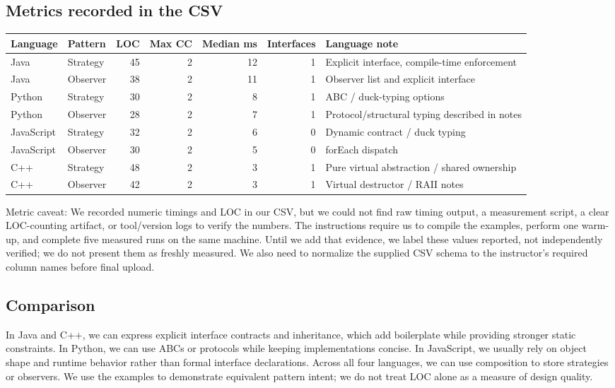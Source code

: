 \documentclass[11pt,a4paper]{article}
\begin{document}
\subsection{Metrics recorded in the CSV}
\small
\begin{tabularx}{\linewidth}{@{}llrrrrY@{}}
\toprule
\textbf{Language} & \textbf{Pattern} & \textbf{LOC} & \textbf{Max CC} & \textbf{Median ms} & \textbf{Interfaces} & \textbf{Language note}\\
\midrule
Java & Strategy & 45 & 2 & 12 & 1 & Explicit interface, compile-time enforcement\\
Java & Observer & 38 & 2 & 11 & 1 & Observer list and explicit interface\\
Python & Strategy & 30 & 2 & 8 & 1 & ABC / duck-typing options\\
Python & Observer & 28 & 2 & 7 & 1 & Protocol/structural typing described in notes\\
JavaScript & Strategy & 32 & 2 & 6 & 0 & Dynamic contract / duck typing\\
JavaScript & Observer & 30 & 2 & 5 & 0 & forEach dispatch\\
C++ & Strategy & 48 & 2 & 3 & 1 & Pure virtual abstraction / shared ownership\\
C++ & Observer & 42 & 2 & 3 & 1 & Virtual destructor / RAII notes\\
\bottomrule
\end{tabularx}
\normalsize

Metric caveat: We recorded numeric timings and LOC in our CSV, but we could not find raw timing output, a measurement script, a clear LOC-counting artifact, or tool/version logs to verify the numbers. The instructions require us to compile the examples, perform one warm-up, and complete five measured runs on the same machine. Until we add that evidence, we label these values reported, not independently verified; we do not present them as freshly measured. We also need to normalize the supplied CSV schema to the instructor's required column names before final upload.

\subsection{Comparison}
In Java and C++, we can express explicit interface contracts and inheritance, which add boilerplate while providing stronger static constraints. In Python, we can use ABCs or protocols while keeping implementations concise. In JavaScript, we usually rely on object shape and runtime behavior rather than formal interface declarations. Across all four languages, we can use composition to store strategies or observers. We use the examples to demonstrate equivalent pattern intent; we do not treat LOC alone as a measure of design quality.
\end{document}
